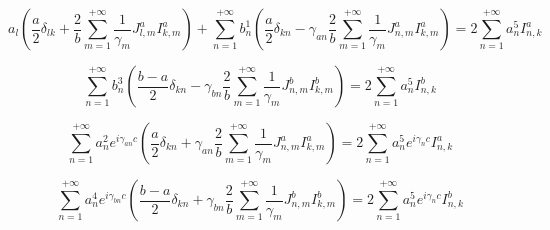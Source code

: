 \begin{equation}
	a_l \left( \frac{a}{2} \delta_{lk} + \frac{2}{b} \sum\limits_{m = 1}^{+\infty} \frac{1}{\gamma_{m}} J^a_{l,m} I^a_{k,m} \right) + \sum\limits_{n = 1}^{+\infty} b^1_n \left( \frac{a}{2} \delta_{kn} - \gamma_{an} \frac{2}{b} \sum\limits_{m = 1}^{+\infty} \frac{1}{\gamma_{m}} J^a_{n,m} I^a_{k,m} \right) = 2 \sum\limits_{n = 1}^{+\infty}a^5_n I^a_{n, k}
\end{equation}

\begin{equation}
	\sum\limits_{n = 1}^{+\infty} b^3_n \left( \frac{b-a}{2} \delta_{kn} - \gamma_{bn} \frac{2}{b} \sum\limits_{m = 1}^{+\infty} \frac{1}{\gamma_{m}} J^b_{n,m} I^b_{k,m} \right) = 2 \sum\limits_{n = 1}^{+\infty}a^5_n I^b_{n, k}
\end{equation}

\begin{equation}
	\sum\limits_{n = 1}^{+\infty} a^2_n e^{i\gamma_{an}c} \left( \frac{a}{2} \delta_{kn} + \gamma_{an} \frac{2}{b} \sum\limits_{m = 1}^{+\infty} \frac{1}{\gamma_{m}} J^a_{n,m} I^a_{k,m} \right) = 2 \sum\limits_{n = 1}^{+\infty}a^5_n e^{i\gamma_{n}c} I^a_{n, k}
\end{equation}

\begin{equation}
	\sum\limits_{n = 1}^{+\infty} a^4_n e^{i\gamma_{bn}c} \left( \frac{b-a}{2} \delta_{kn} + \gamma_{bn} \frac{2}{b} \sum\limits_{m = 1}^{+\infty} \frac{1}{\gamma_{m}} J^b_{n,m} I^b_{k,m} \right) = 2 \sum\limits_{n = 1}^{+\infty}a^5_n e^{i\gamma_{n}c} I^b_{n, k}
\end{equation}
